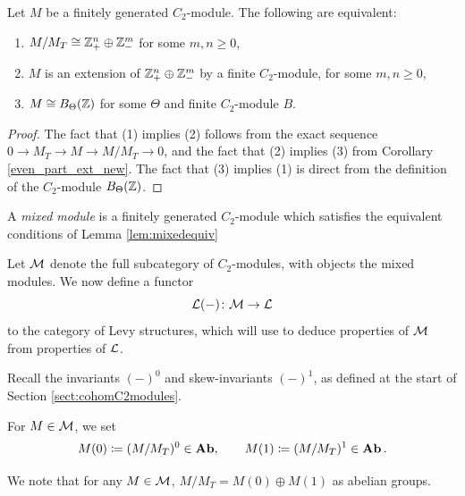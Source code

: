 \begin{lemma}\label{lem:mixedequiv}
  Let $M$ be a finitely generated $C_2$-module. The following are equivalent:
  \begin{enumerate}
    \item $M / M_T \cong {\mathbb Z}_+^n \oplus {\mathbb Z}^m_-$ for some $m,n \geq 0$,
    \item $M$ is an extension of ${\mathbb Z}_+^n \oplus {\mathbb Z}^m_-$ by a finite $C_2$-module, for some $m,n \geq 0$,
    \item $M \cong B_{\Theta}({\mathbb Z})$ for some $\Theta$ and finite $C_2$-module $B$.
  \end{enumerate}
\end{lemma}

\begin{proof}
  The fact that (1) implies (2) follows from the exact sequence $0 \rightarrow M_T \rightarrow M \rightarrow M / M_T \rightarrow 0$, and the fact that (2) implies (3) from Corollary \ref{even_part_ext_new}. The fact that (3) implies (1) is direct from the definition of the $C_2$-module $B_{\Theta}({\mathbb Z})$.
\end{proof}

\begin{defn}
A \emph{mixed module} is a finitely generated $C_2$-module which satisfies the equivalent conditions of Lemma \ref{lem:mixedequiv}
\end{defn}

Let ${\mathcal M}$ denote the full subcategory of $C_2$-modules, with objects the mixed modules. We now define a functor
\[
{\mathcal L}(-) \colon {\mathcal M} \rightarrow {\mathcal L}
\]
to the category of Levy structures, which will use to deduce properties of ${\mathcal M}$ from properties of ${\mathcal L}$.

Recall the invariants $(-)^0$ and skew-invariants $(-)^1$, as defined at the start of Section \ref{sect:cohomC2modules}.
\begin{defn}
  For $M \in {\mathcal M}$, we set
  \[
  M(0) \coloneqq (M / M_T)^0 \in \operatorname{\textbf{Ab}}, \qquad M(1) \coloneqq (M / M_T)^1 \in \operatorname{\textbf{Ab}}.
  \]
\end{defn}

\begin{remark}
  We note that for any $M \in {\mathcal M}$, $M / M_T = M(0) \oplus M(1)$ as abelian groups.
\end{remark}

